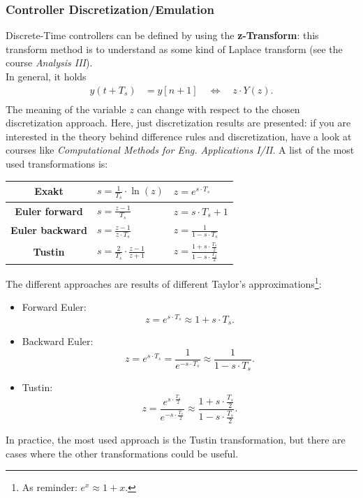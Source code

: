 \documentclass[a4paper,12 pt]{article}
\numberwithin{equation}{section}
\theoremstyle{definition}
\theoremstyle{remark}
\theoremstyle{definition}
\theoremstyle{definition}
\theoremstyle{definition}
\theoremstyle{remark}
\begin{document}
\subsubsection{Controller Discretization/Emulation}
Discrete-Time controllers can be defined by using the \textbf{z-Transform}: this transform method is to understand as some kind of Laplace transform (see the course \textit{Analysis III}). \\ In general, it holds
\begin{align}
y(t+T_s)&=y[n+1] \quad \Leftrightarrow\quad z\cdot Y(z).\\
\end{align}
The meaning of the variable $z$ can change with respect to the chosen discretization approach. Here, just discretization results are presented: if you are interested in the theory behind difference rules and discretization, have a look at courses like \textit{Computational Methods for Eng. Applications I/II}. A list of the most used transformations is:
\begin{center}\begin{tabular}{cll}\toprule
\textbf{Exakt} & $\displaystyle s=\frac{1}{T_s}\cdot \ln(z)$ &  $\displaystyle z=e^{s\cdot T_s}$ \\ \midrule
\textbf{Euler forward} & $\displaystyle s=\frac{z-1}{T_s}$ & $\displaystyle z=s\cdot T_s+1$ \\ \midrule
\textbf{Euler backward} & $\displaystyle s=\frac{z-1}{z\cdot T_s}$ &  $\displaystyle z=\frac{1}{1-s\cdot T_s}$ \\ \midrule
\textbf{Tustin} & $\displaystyle s=\frac{2}{T_s}\cdot \frac{z-1}{z+1}$ &
$\displaystyle z=\frac{1+s\cdot \frac{T_s}{2}}{1-s\cdot \frac{T_s}{2}}$ \\ \bottomrule
\end{tabular}\end{center}
The different approaches are results of different Taylor's approximations\footnote{As reminder: $e^x\approx 1+x$.}:

\begin{itemize}
\item Forward Euler:
\begin{equation}
z=e^{s\cdot T_s}\approx 1+s\cdot T_s.
\end{equation}
\item Backward Euler:
\begin{equation}
z=e^{s\cdot T_s}=\frac{1}{e^{-s\cdot T_s}}\approx\frac{1}{1-s\cdot T_s}.
\end{equation}
\item Tustin:
\begin{equation}
z=\frac{e^{s\cdot \frac{T_s}{2}}}{e^{-s\cdot \frac{T_s}{2}}}\approx\frac{1+s\cdot \frac{T_s}{2}}{1-s\cdot \frac{T_s}{2}}.
\end{equation}
\end{itemize}
In practice, the most used approach is the Tustin transformation, but there are cases where the other transformations could be useful.
\end{document}
